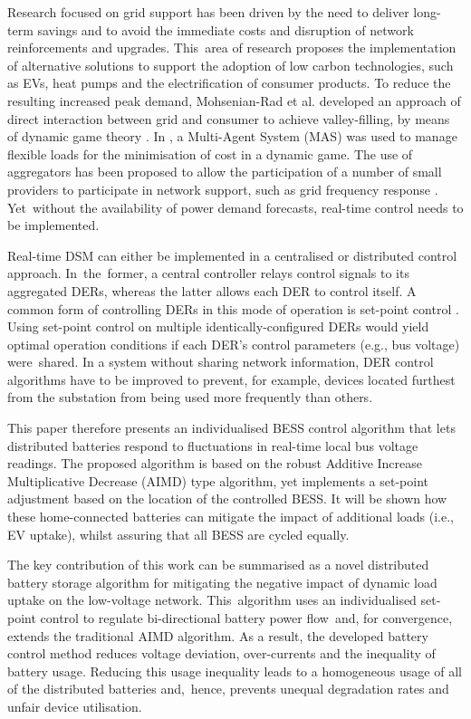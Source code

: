 Research focused on grid support has been driven by the need to deliver long-term savings and to avoid the immediate costs and disruption of network reinforcements and upgrades. This~area of research proposes the implementation of alternative solutions to support the adoption of low carbon technologies, such as EVs, heat pumps and the electrification of consumer products. To reduce the resulting increased peak demand, Mohsenian-Rad et al. developed an approach of direct interaction between grid and consumer to achieve valley-filling, by means of dynamic game theory \cite{Mohsenian-Rad2010}. In \cite{Karfopoulos2013}, a Multi-Agent System (MAS) was used to manage flexible loads for the minimisation of cost in a dynamic game. The use of aggregators has been proposed to allow the participation of a number of small providers to participate in network support, such as grid frequency response \cite{Wu2012a, Samadi2012, Xu2015b}. Yet~without the availability of power demand forecasts, real-time control needs to be implemented.

Real-time DSM can either be implemented in a centralised or distributed control approach. In~the~former, a central controller relays control signals to its aggregated DERs, whereas the latter allows each DER to control itself. A common form of controlling DERs in this mode of operation is set-point control \cite{Leadbetter2012685}. Using set-point control on multiple identically-configured DERs would yield optimal operation conditions if each DER's control parameters (e.g., bus voltage) were~shared. In a system without sharing network information, DER control algorithms have to be improved to prevent, for example, devices located furthest from the substation from being used more frequently than others.

This paper therefore presents an individualised BESS control algorithm that lets distributed batteries respond to fluctuations in real-time local bus voltage readings. The proposed algorithm is based on the robust Additive Increase Multiplicative Decrease (AIMD) type algorithm, yet implements a set-point adjustment based on the location of the controlled BESS. It will be shown how these home-connected batteries can mitigate the impact of additional loads (i.e., EV uptake), whilst assuring that all BESS are cycled equally.

The key contribution of this work can be summarised as a novel distributed battery storage algorithm for mitigating the negative impact of dynamic load uptake on the low-voltage network. This~algorithm uses an individualised set-point control to regulate bi-directional battery power flow~and, for convergence, extends the traditional AIMD algorithm. As a result, the developed battery control method reduces voltage deviation, over-currents and the inequality of battery usage. Reducing this usage inequality leads to a homogeneous usage of all of the distributed batteries and,~hence, prevents unequal degradation rates and unfair device utilisation.

